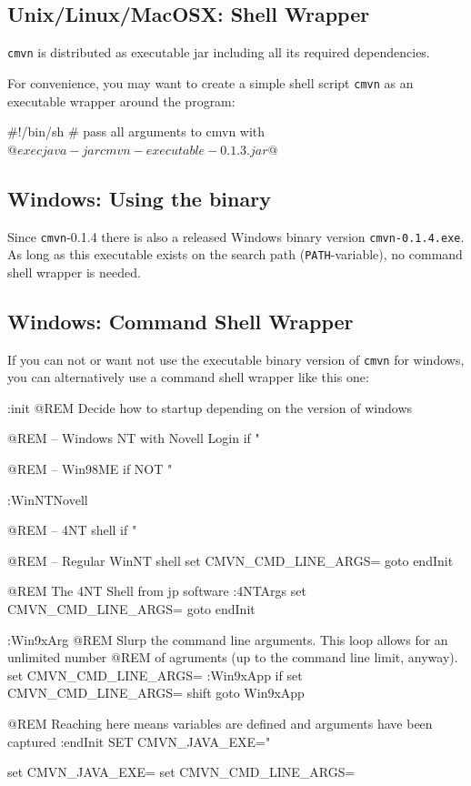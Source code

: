 \documentclass[a4paper,12pt,english,oneside,halfparskip]{scrartcl}
\newcommand{\cmvn}{\texttt{cmvn}}
\newcommand{\code}[1]{\texttt{#1}}
\begin{document}
\subsection{Unix/Linux/MacOSX: Shell Wrapper}

\cmvn{} is distributed as executable jar including all its required dependencies. 

For convenience, you may want to create a simple shell script \code{cmvn} as an executable wrapper around the program:

\begin{Cmdline}[caption={Shell wrapper: \code{cmvn}}]
#!/bin/sh
# pass all arguments to cmvn with $@
exec java -jar cmvn-executable-0.1.3.jar $@
\end{Cmdline}

\subsection{Windows: Using the binary}

Since \cmvn{}-0.1.4 there is also a released Windows binary version \code{cmvn-0.1.4.exe}. As long as this executable exists on the search path (\code{PATH}-variable), no command shell wrapper is needed.

\subsection{Windows: Command Shell Wrapper}

If you can not or want not use the executable binary version of \cmvn{} for windows, you can alternatively use a command shell wrapper like this one:

\begin{Cmdline}[caption={Windows Command Shell wrapper: \code{cmvn.bat}}]
:init
@REM Decide how to startup depending on the version of windows

@REM -- Windows NT with Novell Login
if "%

@REM -- Win98ME
if NOT "%

:WinNTNovell

@REM -- 4NT shell
if "%

@REM -- Regular WinNT shell
set CMVN_CMD_LINE_ARGS=%
goto endInit

@REM The 4NT Shell from jp software
:4NTArgs
set CMVN_CMD_LINE_ARGS=%
goto endInit

:Win9xArg
@REM Slurp the command line arguments.  This loop allows for an unlimited number
@REM of agruments (up to the command line limit, anyway).
set CMVN_CMD_LINE_ARGS=
:Win9xApp
if %
set CMVN_CMD_LINE_ARGS=%
shift
goto Win9xApp

@REM Reaching here means variables are defined and arguments have been captured
:endInit
SET CMVN_JAVA_EXE="%


set CMVN_JAVA_EXE=
set CMVN_CMD_LINE_ARGS=
\end{Cmdline}
\end{document}
